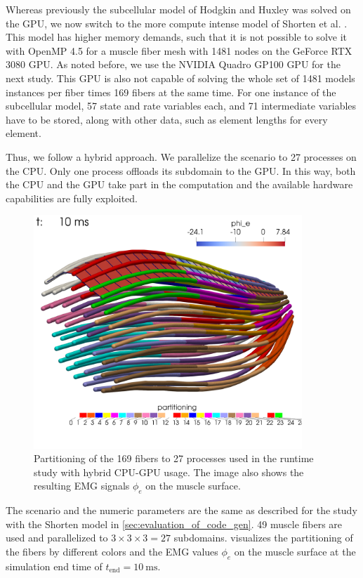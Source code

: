 Whereas previously the subcellular model of Hodgkin and Huxley was solved on the GPU, we now switch to the more compute intense model of Shorten et al. \cite{Shorten2007}. This model has higher memory demands, such that it is not possible to solve it with OpenMP 4.5 for a muscle fiber mesh with 1481 nodes on the GeForce RTX 3080 GPU. As noted before, we use the NVIDIA Quadro GP100 GPU for the next study.
This GPU is also not capable of solving the whole set of 1481 models instances per fiber times 169 fibers at the same time. For one instance of the subcellular model, 57 state and rate variables each, and 71 intermediate variables have to be stored, along with other data, such as element lengths for every element.

Thus, we follow a hybrid approach. We parallelize the scenario to 27 processes on the CPU. Only one process offloads its subdomain to the GPU. In this way, both the CPU and the GPU take part in the computation and the available hardware capabilities are fully exploited.

\begin{figure}
  \centering%
  \includegraphics[width=0.9\textwidth]{images/results/studies/gpu_parallelization.png}%
  \caption{Partitioning of the 169 fibers to 27 processes used in the runtime study with hybrid CPU-GPU usage. The image also shows the resulting EMG signals $\phi_e$ on the muscle surface.}%
  \label{fig:gpu_parallelization}%
\end{figure}

The scenario and the numeric parameters are the same as described for the study with the Shorten model in \cref{sec:evaluation_of_code_gen}. 49 muscle fibers are used and parallelized to $3\times 3\times 3=27$ subdomains.  visualizes the partitioning of the fibers by different colors and the EMG values $\phi_e$ on the muscle surface at the simulation end time of $t_\text{end}=\SI{10}{\ms}$.

